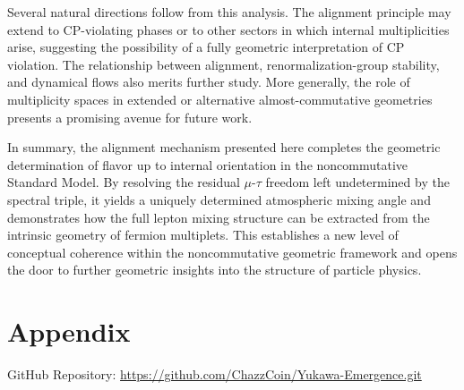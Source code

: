Several natural directions follow from this analysis.
The alignment principle may extend to CP-violating phases or to other sectors in which internal multiplicities arise, suggesting the possibility of a fully geometric interpretation of CP violation. The relationship between alignment, renormalization-group stability, and dynamical flows also merits further study. More generally, the role of multiplicity spaces in extended or alternative almost-commutative geometries presents a promising avenue for future work.

In summary, the alignment mechanism presented here completes the geometric determination of flavor up to internal orientation in the noncommutative Standard Model. By resolving the residual $\mu$-$\tau$ freedom left undetermined by the spectral triple, it yields a uniquely determined atmospheric mixing angle and demonstrates how the full lepton mixing structure can be extracted from the intrinsic geometry of fermion multiplets. This establishes a new level of conceptual coherence within the noncommutative geometric framework and opens the door to further geometric insights into the structure of particle physics.

\appendix

\section{Appendix}

GitHub Repository: \url{https://github.com/ChazzCoin/Yukawa-Emergence.git}



